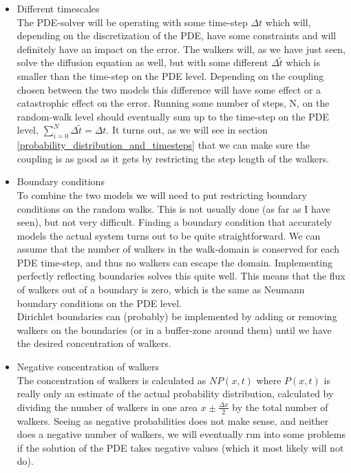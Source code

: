 \begin{itemize}
 \item Different timescales\\
  The PDE-solver will be operating with some time-step $\Delta t$ which will, depending on the discretization of the PDE, have some constraints and will definitely have an impact on the error. 
  The walkers will, as we have just seen, solve the diffusion equation as well, but with some different $\Delta \tilde{t}$ which is smaller than the time-step on the PDE level. 
  Depending on the coupling chosen between the two models this difference will have some effect or a catastrophic effect on the error. 
  Running some number of steps, N, on the random-walk level should eventually sum up to the time-step on the PDE level, $\sum\limits_{i=0}^N \Delta\tilde{t} = \Delta t$. 
  It turns out, as we will see in section \ref{probability_distribution_and_timesteps} that we can make sure the coupling is as good as it gets by restricting the step length of the walkers.
 \item Boundary conditions\\
 To combine the two models we will need to put restricting boundary conditions on the random walks. This is not usually done (as far as I have seen), but not very difficult. 
 Finding a boundary condition that accurately models the actual system turns out to be quite straightforward.
 We can assume that the number of walkers in the walk-domain is conserved for each PDE time-step, and thus no walkers can escape the domain. 
 Implementing perfectly reflecting boundaries solves this quite well. 
 This means that the flux of walkers out of a boundary is zero, which is the same as Neumann boundary conditions on the PDE level. \\
 Dirichlet boundaries can (probably) be implemented by adding or removing walkers on the boundaries (or in a buffer-zone around them) until we have the desired concentration of walkers.
 \item Negative concentration of walkers \\
 The concentration of walkers is calculated as $NP(x,t)$ where $P(x,t)$ is really only an estimate of the actual probability distribution, calculated by dividing the number of walkers in one area $x\pm\frac{\Delta x}{2}$ by the total number of walkers. 
 Seeing as negative probabilities does not make sense, and neither does a negative number of walkers, we will eventually run into some problems if the solution of the PDE takes negative values (which it most likely will not do). 

\end{itemize}
